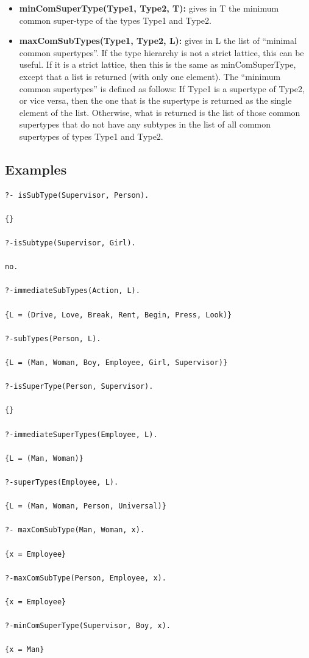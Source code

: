 \documentclass{book}
\begin{document}
\begin{itemize}
  \item {\bf minComSuperType(Type1, Type2, T):} gives in T
  the minimum common super-type of the types Type1 and Type2.

  \item {\bf maxComSubTypes(Type1, Type2, L):} gives in L the
  list of ``minimal common supertypes''.  If the type hierarchy is not a
  strict lattice, this can be useful.  If it is a strict lattice, then
  this is the same as minComSuperType, except that a list is returned
  (with only one element).  The ``minimum common supertypes'' is defined
  as follows: If Type1 is a supertype of Type2, or vice versa, then
  the one that is the supertype is returned as the single element of
  the list.  Otherwise, what is returned is the list of those common
  supertypes that do not have any subtypes in the list of all common
  supertypes of types Type1 and Type2.

\end{itemize}

\subsection{Examples}


\begin{verbatim}
?- isSubType(Supervisor, Person).

{}

?-isSubtype(Supervisor, Girl).

no.

?-immediateSubTypes(Action, L).

{L = (Drive, Love, Break, Rent, Begin, Press, Look)}

?-subTypes(Person, L).

{L = (Man, Woman, Boy, Employee, Girl, Supervisor)}

?-isSuperType(Person, Supervisor).

{}

?-immediateSuperTypes(Employee, L).

{L = (Man, Woman)}

?-superTypes(Employee, L).

{L = (Man, Woman, Person, Universal)}

?- maxComSubType(Man, Woman, x).

{x = Employee}

?-maxComSubType(Person, Employee, x).

{x = Employee}

?-minComSuperType(Supervisor, Boy, x).

{x = Man}
\end{verbatim}
\end{document}
